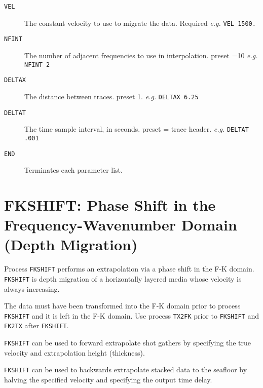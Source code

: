 \begin{description}
\item[\texttt{VEL}]    The constant velocity to use to migrate the data.   
    Required       \textit{e.g.} \texttt{VEL 1500.}                       
                                                                          
\item[\texttt{NFINT}]  The number of adjacent frequencies to use in interpolation.
    \Gls{preset} =10     \textit{e.g.} \texttt{NFINT 2}                   
                                                                          
\item[\texttt{DELTAX}] The distance between traces.                       
    \Gls{preset} 1.      \textit{e.g.} \texttt{DELTAX 6.25}               
                                                                          
\item[\texttt{DELTAT}] The time sample interval, in seconds.              
    \Gls{preset} = trace header.   \textit{e.g.}  \texttt{DELTAT .001}    
                                                                          
\item[\texttt{END}] Terminates each parameter list.
\end{description}

\section{FKSHIFT: Phase Shift in the Frequency-Wavenumber Domain (Depth Migration)}
\label{cmd_fkshift}

Process \texttt{FKSHIFT} performs an extrapolation via a phase shift in the F-K
domain.  \texttt{FKSHIFT} is depth migration of a horizontally layered media
whose velocity is always increasing.

The data must have been transformed into the F-K domain prior to process
\texttt{FKSHIFT} and it is left in the F-K domain.  Use process \texttt{TX2FK} prior to
\texttt{FKSHIFT} and \texttt{FK2TX} after \texttt{FKSHIFT}.

\texttt{FKSHIFT} can be used to forward extrapolate \gls{shot} \glspl{gather} by specifying
the true velocity and extrapolation height (thickness).

\texttt{FKSHIFT} can be used to backwards extrapolate stacked data to the
seafloor by halving the specified velocity and specifying the output
time delay.

